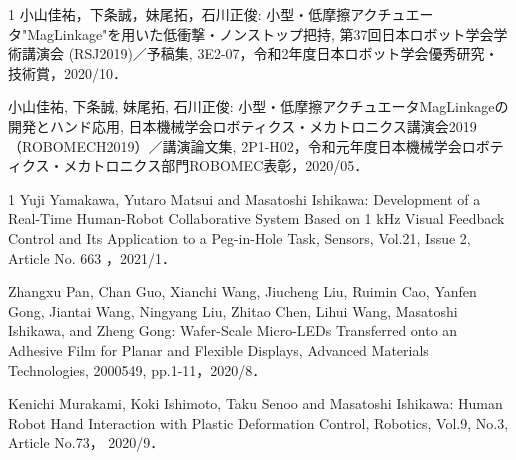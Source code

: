 \begin{受賞}{1}
小山佳祐，下条誠，妹尾拓，石川正俊: 小型・低摩擦アクチュエータ"MagLinkage"を用いた低衝撃・ノンストップ把持, 第37回日本ロボット学会学術講演会 (RSJ2019)／予稿集, 3E2-07，令和2年度日本ロボット学会優秀研究・技術賞，2020/10．

小山佳祐, 下条誠, 妹尾拓, 石川正俊: 小型・低摩擦アクチュエータMagLinkageの開発とハンド応用, 日本機械学会ロボティクス・メカトロニクス講演会2019（ROBOMECH2019）／講演論文集, 2P1-H02，令和元年度日本機械学会ロボティクス・メカトロニクス部門ROBOMEC表彰，2020/05．

\end{受賞}

\begin{雑誌論文}{1}
Yuji Yamakawa, Yutaro Matsui and Masatoshi Ishikawa: Development of a Real-Time Human-Robot Collaborative System Based on 1 kHz Visual Feedback Control and Its Application to a Peg-in-Hole Task, Sensors, Vol.21, Issue 2, Article No. 663 ，2021/1．

Zhangxu Pan, Chan Guo, Xianchi Wang, Jiucheng Liu, Ruimin Cao, Yanfen Gong, Jiantai Wang, Ningyang Liu, Zhitao Chen, Lihui Wang, Masatoshi Ishikawa, and Zheng Gong: Wafer-Scale Micro-LEDs Transferred onto an Adhesive Film for Planar and Flexible Displays, Advanced Materials Technologies, 2000549, pp.1-11，2020/8．

Kenichi Murakami, Koki Ishimoto, Taku Senoo and Masatoshi Ishikawa: Human Robot Hand Interaction with Plastic Deformation Control, Robotics, Vol.9, No.3, Article No.73，	2020/9．

\end{雑誌論文}

